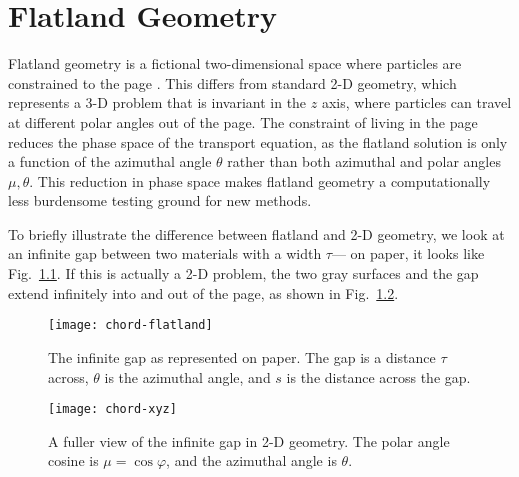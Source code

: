 
\chapter{Flatland Geometry}\label{chap:flatland}

Flatland geometry is a fictional two-dimensional space where particles are
constrained to the page \cite{Abb1884,Asa2008}. This differs from standard 2-D
geometry, which represents a 3-D problem that is invariant in the $z$ axis,
where particles can travel at different polar angles out of the page. The
constraint of living in the page reduces the phase space of the transport
equation, as the flatland solution is only a function of the azimuthal angle
$\theta$
rather than both azimuthal and polar angles $\mu,\theta$. This reduction in
phase space makes 
flatland geometry a computationally less burdensome testing ground for new
methods.

To briefly illustrate the difference between flatland and 2-D geometry, we
look at an infinite gap between two materials with a width $\tau$---%
on paper, it looks like Fig.~\ref{fig:chordFlatland}. If this is actually a
2-D problem, the two gray surfaces and the gap extend infinitely into and out of
the page, as shown in Fig.~\ref{fig:chordXy}.

\begin{figure}[htb]
  \centering
  \texttt{[image: chord-flatland]}
  \caption[The infinite gap as represented on paper.]%
  {The infinite gap as represented on paper. The gap is a distance
  $\tau$ across, $\theta$ is the azimuthal angle, and $s$ is the
  distance across the gap.}
  \label{fig:chordFlatland}
\end{figure}

\begin{figure}[htb]
  \centering
  \texttt{[image: chord-xyz]}
  \caption[A fuller view of the infinite gap in 2-D geometry.]%
  {A fuller view of the infinite gap in 2-D geometry.
  The polar angle cosine is $\mu= \cos \varphi$, and the azimuthal angle is
  $\theta$.}
  \label{fig:chordXy}
\end{figure}
%

